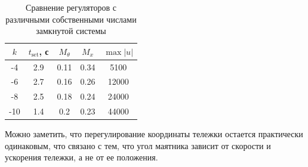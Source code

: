 \begin{table}[ht!]
    \centering
    \begin{tabular}{|c|c|c|c|c|}
        \hline
        $k$ & $t_{\text{set}}$, с & $M_{\theta}$ & $M_{x}$ & $\max{|u|}$ \\
        \hline
        -4 & 2.9 & 0.11 & 0.34 & 5100 \\
        \hline
        -6 & 2.7 & 0.16 & 0.26 & 12000 \\
        \hline
        -8 & 2.5 & 0.18 & 0.24 & 24000 \\
        \hline
        -10 & 1.4 & 0.2 & 0.23 & 44000 \\
        \hline
    \end{tabular}
    \caption{Сравнение регуляторов с различными собственными числами замкнутой системы}
    \label{tab:modal_control_cmp}
\end{table}

Можно заметить, что перегулирование координаты тележки остается практически одинаковым, 
что связано с тем, что угол маятника зависит от скорости и ускорения тележки, а не от ее положения. 

